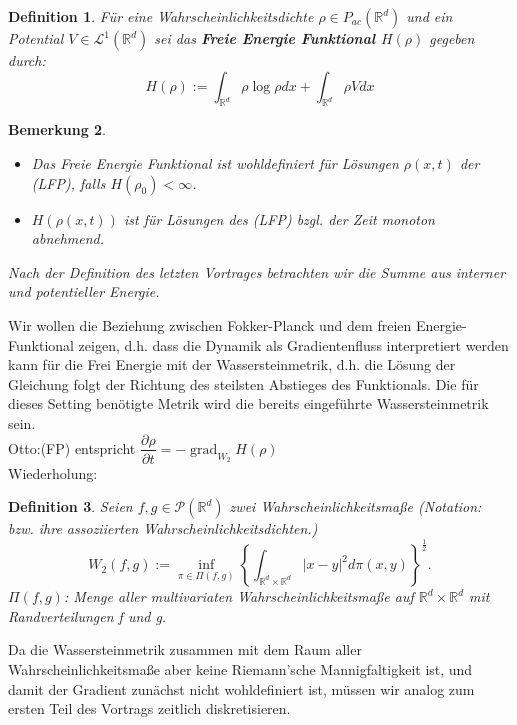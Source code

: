 \documentclass[11pt,a4paper,notitlepage]{scrreprt}
\newcommand{\RR}{\mathbb{R}}
\newcommand{\grad}{\operatorname{grad}}
\newtheorem{defi}{Definition}[section]
\newtheorem{bem}[defi]{Bemerkung}
\begin{document}
\begin{defi}
Für eine Wahrscheinlichkeitsdichte $\rho\in P_{ac}(\RR^d)$ und ein Potential $V\in\mathcal{L}^1(\RR^d)$ sei das \textbf{Freie Energie Funktional $H(\rho)$} gegeben durch:
\begin{equation}
H(\rho):=\int_{\RR^d} \rho\log\rho dx + \int_{\RR^d}\rho V dx \label{FEFktn}
\end{equation}
\end{defi}

\begin{bem}
\begin{itemize}
\item Das Freie Energie Funktional ist wohldefiniert für Lösungen $\rho(x,t)$ der (LFP), falls $H(\rho_0)<\infty$.
\item $H(\rho(x,t))$ ist für Lösungen des (LFP) bzgl. der Zeit monoton abnehmend.\end{itemize}
\item Nach der Definition des letzten Vortrages betrachten wir die Summe aus interner und potentieller Energie.
\end{bem}

Wir wollen die Beziehung zwischen Fokker-Planck und dem freien Energie-Funktional zeigen, d.h. dass die Dynamik als Gradientenfluss interpretiert werden kann für die Frei Energie mit der Wassersteinmetrik, d.h. die Lösung der Gleichung folgt der Richtung des steilsten Abstieges des Funktionals. Die für dieses Setting benötigte Metrik wird die bereits eingeführte Wassersteinmetrik sein. \\Otto:(FP) entspricht $\dfrac{\partial\rho}{\partial t} = -\grad_{W_2} H(\rho)$\\

Wiederholung:
\begin{defi}
Seien $f,g\in\mathcal{P}(\RR^d)$ zwei Wahrscheinlichkeitsmaße (Notation: bzw. ihre assoziierten Wahrscheinlichkeitsdichten.)
\begin{equation}
W_2(f,g):=\inf_{\pi \in \Pi(f,g)} \left\{ \int_{\RR^d\times\RR^d} \vert x-y \vert^2 d\pi(x,y)\right\}^\frac{1}{2}.\label{W2}
\end{equation}
$\Pi(f,g)$: Menge aller multivariaten Wahrscheinlichkeitsmaße auf $\RR^d \times \RR^d$ mit Randverteilungen f und g.
\end{defi}
Da die Wassersteinmetrik zusammen mit dem Raum aller Wahrscheinlichkeitsmaße aber keine Riemann'sche Mannigfaltigkeit ist, und damit der Gradient zunächst nicht wohldefiniert ist, müssen wir analog zum ersten Teil des Vortrags zeitlich diskretisieren.\\
\end{document}
